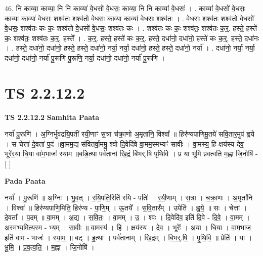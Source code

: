 \documentclass[17pt]{extarticle}
\begin{document}
46. नि काव्या॒ काव्या॒ नि नि काव्या॑ वे॒धसो॑ वे॒धसः॒ काव्या॒ नि नि काव्या॑ वे॒धसः॑ । . काव्या॑ वे॒धसो॑ वे॒धसः॒ काव्या॒ काव्या॑ वे॒धसः॒ शश्व॑तः॒ शश्व॑तो वे॒धसः॒ काव्या॒ काव्या॑ वे॒धसः॒ शश्व॑तः । . वे॒धसः॒ शश्व॑तः॒ शश्व॑तो वे॒धसो॑ वे॒धसः॒ शश्व॑तः कः कः॒ शश्व॑तो वे॒धसो॑ वे॒धसः॒ शश्व॑तः कः । . शश्व॑तः कः कः॒ शश्व॑तः॒ शश्व॑तः क॒र्॒. हस्ते॒ हस्ते॑ कः॒ शश्व॑तः॒ शश्व॑तः क॒र्॒. हस्ते᳚ । . क॒र्॒. हस्ते॒ हस्ते॑ कः क॒र्॒. हस्ते॒ दधा॑नो॒ दधा॑नो॒ हस्ते॑ कः क॒र्॒. हस्ते॒ दधा॑नः । . हस्ते॒ दधा॑नो॒ दधा॑नो॒ हस्ते॒ हस्ते॒ दधा॑नो॒ नर्या॒ नर्या॒ दधा॑नो॒ हस्ते॒ हस्ते॒ दधा॑नो॒ नर्या᳚ । . दधा॑नो॒ नर्या॒ नर्या॒ दधा॑नो॒ दधा॑नो॒ नर्या॑ पु॒रूणि॑ पु॒रूणि॒ नर्या॒ दधा॑नो॒ दधा॑नो॒ नर्या॑ पु॒रूणि॑ । \newline
\pagebreak
{}
\section*{ TS 2.2.12.2 }

\textbf{TS 2.2.12.2 } \newline
\textbf{Samhita Paata} \newline

नर्या॑ पु॒रूणि॑ । अ॒ग्निर्भु॑वद्रयि॒पती॑ रयी॒णाꣳ स॒त्रा च॑क्रा॒णो अ॒मृता॑नि॒ विश्वा᳚ ॥ हिर॑ण्यपाणिमू॒तये॑ सवि॒तार॒मुप॑ ह्वये । स चेत्ता॑ दे॒वता॑ प॒दं ॥वा॒मम॒द्य स॑वितर्वा॒ममु॒ श्वो दि॒वेदि॑वे वा॒मम॒स्मभ्यꣳ॑ सावीः । वा॒मस्य॒ हि क्षय॑स्य देव॒ भूरे॑र॒या धि॒या वा॑म॒भाजः॑ स्याम ॥बडि॒त्था पर्व॑तानां खि॒द्रं बि॑भर्.षि पृथिवि । प्र या भू॑मि प्रवत्वति म॒ह्ना जि॒नोषि॑ - [  ] \newline

\textbf{Pada Paata} \newline

नर्या᳚ । पु॒रूणि॑ ॥ अ॒ग्निः । भु॒व॒त् । र॒यि॒पति॒रिति॑ रयि - पतिः॑ । र॒यी॒णाम् । स॒त्रा । च॒क्रा॒णः । अ॒मृता॑नि । विश्वा᳚ ॥ हिर॑ण्यपाणि॒मिति॒ हिर॑ण्य - पा॒णि॒म् । ऊ॒तये᳚ । स॒वि॒तार᳚म् । उपेति॑ । ह्व॒ये॒ ॥ सः । चेत्ता᳚ । दे॒वता᳚ । प॒दम् ॥ वा॒मम् । अ॒द्य । स॒वि॒तः॒ । वा॒मम् । उ॒ । श्वः । दि॒वेदि॑व॒ इति॑ दि॒वे - दि॒वे॒ । वा॒मम् । अ॒स्मभ्य॒मित्य॒स्म - भ्य॒म् । सा॒वीः॒ ॥ वा॒मस्य॑ । हि । क्षय॑स्य । दे॒व॒ । भूरेः᳚ । अ॒या । धि॒या । वा॒म॒भाज॒ इति॑ वाम - भाजः॑ । स्या॒म॒ ॥ बट् । इ॒त्था । पर्व॑तानाम् । खि॒द्रम् । बि॒भ॒र्॒.षि॒ । पृ॒थि॒वि॒ ॥ प्रेति॑ । या । भू॒मि॒ । प्र॒व॒त्व॒ति॒ । म॒ह्ना । जि॒नोषि॑ ।  \newline
\end{document}
